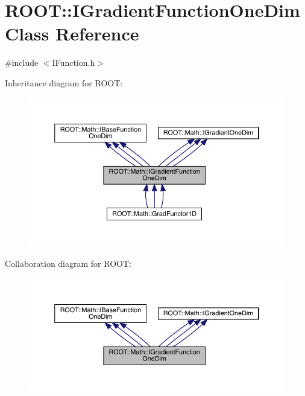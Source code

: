 \hypertarget{classROOT_1_1Math_1_1IGradientFunctionOneDim}{}\section{R\+O\+OT\+:\+:I\+Gradient\+Function\+One\+Dim Class Reference}
\label{classROOT_1_1Math_1_1IGradientFunctionOneDim}


{\ttfamily \#include $<$I\+Function.\+h$>$}



Inheritance diagram for R\+O\+OT\+:
\nopagebreak
\begin{figure}[H]
\begin{center}
\leavevmode
\includegraphics[width=350pt]{df/d9b/classROOT_1_1Math_1_1IGradientFunctionOneDim__inherit__graph}
\end{center}
\end{figure}


Collaboration diagram for R\+O\+OT\+:
\nopagebreak
\begin{figure}[H]
\begin{center}
\leavevmode
\includegraphics[width=350pt]{df/dbd/classROOT_1_1Math_1_1IGradientFunctionOneDim__coll__graph}
\end{center}
\end{figure}
